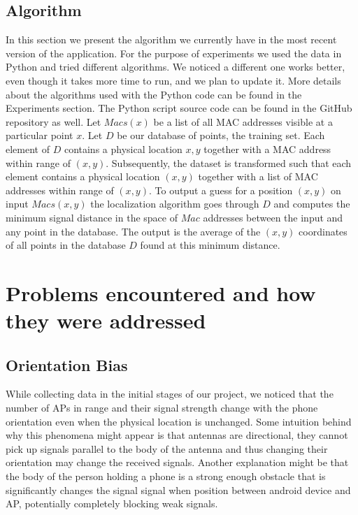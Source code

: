 \documentclass[11pt]{article}
\begin{document}
\subsection{Algorithm}
In this section we present the algorithm we currently have in the most recent version of the application. For the purpose of experiments we used the data in Python and tried different algorithms. We noticed a different one works better, even though it takes more time to run, and we plan to update it. More details about the algorithms used with the Python code can be found in the Experiments section. The Python script source code can be found in the GitHub repository as well.
Let $Macs(x)$ be a list of all MAC addresses visible at a particular point $x$. Let $D$ be our database of points, the training set. Each element of $D$ contains a physical location $x,y$ together with a MAC address within range of $(x,y)$. Subsequently, the dataset is transformed such that each element contains a physical location $(x,y)$ together with a list of MAC addresses within range of $(x,y)$. To output a guess for a position $(x,y)$ on input $Macs(x,y)$ the localization algorithm goes through $D$ and computes the minimum signal distance in the space of $Mac$ addresses between the input and any point in the database. The output is the average of the $(x,y)$ coordinates of all points in the database $D$ found at this minimum distance.
\section{Problems encountered and how they were addressed}
\subsection{Orientation Bias}
While collecting data in the initial stages of our project, we noticed that the number of APs in range and their signal strength change with the phone orientation even when the physical location is unchanged. Some intuition behind why this phenomena might appear is that antennas are directional, they cannot pick up signals parallel to the body of the antenna and thus changing their orientation may change the received signals. Another explanation might be that the body of the person holding a phone is a strong enough obstacle that is significantly changes the signal signal when position between android device and AP, potentially completely blocking weak signals.
\end{document}
